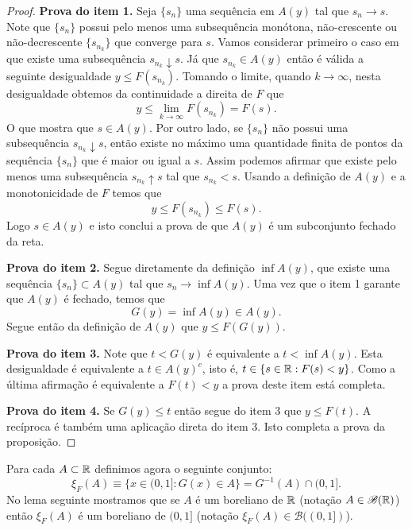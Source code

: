 \begin{proof}
	{\bf Prova do item 1.} 
	Seja $\{s_n\}$ uma sequência em $A(y)$ tal que $s_n\to s$. 
	Note que $\{s_n\}$ possui pelo menos uma subsequência 
	monótona, não-crescente ou não-decrescente $\{s_{n_{k}}\}$ 
	que converge para $s$. Vamos considerar primeiro o caso 
	em que existe uma subsequência $s_{n_k}\downarrow s$. 
	Já que $s_{n_k}\in A(y)$ então 
	é válida a seguinte desigualdade $y\leq F(s_{n_k})$.
	Tomando o limite, quando $k\to\infty$, nesta desigualdade 
	obtemos da continuidade a direita de $F$ que 
		\[ 
			y \leq 
			\lim_{k\to\infty} F(s_{n_k}) 
			= 
			F(s).
		\]
	O que mostra que $s\in A(y)$.
	Por outro lado, se $\{s_n\}$ não possui uma subsequência 
	$s_{n_k}\downarrow s$, então existe no máximo uma quantidade
	finita de pontos da sequência $\{s_n\}$ 
	que é maior ou igual a $s$.
	Assim podemos afirmar que existe pelo menos 
	uma subsequência $s_{n_k}\uparrow s$
	tal que $s_{n_k} < s$. Usando  
	a definição de $A(y)$ e a monotonicidade de $F$ 
	temos que 
		\[
			y\leq F(s_{n_k})\leq F(s).
		\]
	Logo $s\in A(y)$ e isto conclui a prova de que $A(y)$ é 
	um subconjunto fechado da reta.
	
	{\bf Prova do item 2.} Segue diretamente da definição $\inf A(y)$,
	que 	existe uma sequência $\{s_n\}\subset A(y)$ tal que $s_n\to \inf A(y)$.
	Uma vez que o item 1 garante que $A(y)$ é fechado, temos que 
		\[G(y)=\inf A(y) \in A(y).\]
	 Segue então da definição de $A(y)$ que $y\leq F(G(y))$.


	{\bf Prova do item 3.} Note que $t<G(y)$ é equivalente a
	$t<\inf A(y)$. Esta desigualdade é equivalente a 
	$t\in A(y)^c$, isto é, $t\in\{s\in\mathbb{R}: F(s)<y\}$. 
	Como a última afirmação é equivalente a $F(t)<y$ a
	prova deste item está completa.
	
	
	{\bf Prova do item 4.} Se $G(y)\leq t$ então 
	segue do item 3 que 	$y\leq F(t)$. A recíproca é 
	também uma aplicação direta do item 3.  
	Isto completa a prova da proposição.
\end{proof}

\bigskip

Para cada $A\subset \mathbb{R}$ definimos agora o seguinte conjunto:
	\begin{equation}\label{def-xi-F}
		\xi_F(A) \equiv \{ x\in (0,1]: G(x)\in A \} = G^{-1}(A)\cap (0,1].
	\end{equation}
No lema seguinte mostramos que se $A$ 
é um boreliano de $\mathbb{R}$ (notação $A\in\mathscr{B}(\mathbb{R})$)  
então 
$\xi_F(A)$ é um boreliano de $(0,1]$ 
(notação $\xi_F(A) \in\mathscr{B}((0,1])$).


